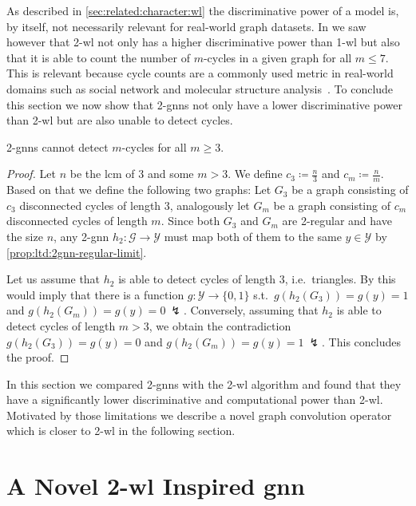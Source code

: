 As described in \cref{sec:related:character:wl} the discriminative power of a model is, by itself, not necessarily relevant for real-world graph datasets.
In  we saw however that 2-\acs{wl} not only has a higher discriminative power than 1-\acs{wl} but also that it is able to count the number of $m$-cycles in a given graph for all $m \leq 7$.
This is relevant because cycle counts are a commonly used metric in real-world domains such as social network and molecular structure analysis~\cite{Milo2002}\cite{Newman2003}\cite{Welser2007}\cite{Adamson1973}\cite{Kekule1866}.
To conclude this section we now show that 2-\acsp{gnn} not only have a lower discriminative power than 2-\acs{wl} but are also unable to detect cycles.
\begin{prop}
	2-\acsp{gnn} cannot detect $m$-cycles for all $m \geq 3$.
\end{prop}
\begin{proof}
	Let $n$ be the \ac{lcm} of $3$ and some $m > 3$.
	We define $c_3 \coloneqq \frac{n}{3}$ and $c_m \coloneqq \frac{n}{m}$.
	Based on that we define the following two graphs:
	Let $G_3$ be a graph consisting of $c_3$ disconnected cycles of length $3$, analogously let $G_m$ be a graph consisting of $c_m$ disconnected cycles of length $m$.
	Since both $G_3$ and $G_m$ are 2-regular and have the size $n$, any 2-\ac{gnn} $h_2: \mathcal{G} \to \mathcal{Y}$ must map both of them to the same $y \in \mathcal{Y}$ by \cref{prop:ltd:2gnn-regular-limit}.

	Let us assume that $h_2$ is able to detect cycles of length $3$, i.e.\ triangles.
	By  this would imply that there is a function $g: \mathcal{Y} \to \{ 0, 1\}$ s.t.\ $g(h_2(G_3)) = g(y) = 1$ and $g(h_2(G_m)) = g(y) = 0\ \lightning$.
	Conversely, assuming that $h_2$ is able to detect cycles of length $m > 3$, we obtain the contradiction $g(h_2(G_3)) = g(y) = 0$  and $g(h_2(G_m)) = g(y) = 1\ \lightning$.
	This concludes the proof.
\end{proof}

In this section we compared 2-\acsp{gnn} with the 2-\acs{wl} algorithm and found that they have a significantly lower discriminative and computational power than 2-\acs{wl}.
Motivated by those limitations we describe a novel graph convolution operator which is closer to 2-\acs{wl} in the following section.

\section{A Novel 2-\acs*{wl} Inspired \acs*{gnn}}%
\label{sec:ltd:wl2gnn}

